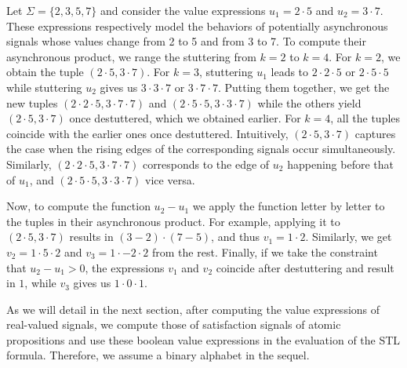 \begin{example} \label{ex:valexpr}
	Let $\Sigma = \{2, 3, 5, 7\}$ and consider the value expressions $u_1 = 2 \cdot 5$ and $u_2 = 3 \cdot 7$.
	These expressions respectively model the behaviors of potentially asynchronous signals whose values change from 2 to 5 and from 3 to 7.
	To compute their asynchronous product, we range the stuttering from $k = 2$ to $k = 4$.
	For $k = 2$, we obtain the tuple $(2 \cdot 5, 3 \cdot 7)$.
	For $k = 3$, stuttering $u_1$ leads to $2 \cdot 2 \cdot 5$ or $2 \cdot 5 \cdot 5$ while stuttering $u_2$ gives us $3 \cdot 3 \cdot 7$ or $3 \cdot 7 \cdot 7$.
	Putting them together, we get the new tuples $(2 \cdot 2 \cdot 5, 3 \cdot 7 \cdot 7)$ and $(2 \cdot 5 \cdot 5, 3 \cdot 3 \cdot 7)$ while the others yield $(2 \cdot 5, 3 \cdot 7)$ once destuttered, which we obtained earlier.
	For $k = 4$, all the tuples coincide with the earlier ones once destuttered.
	Intuitively, $(2 \cdot 5, 3 \cdot 7)$ captures the case when the rising edges of the corresponding signals occur simultaneously.
	Similarly, $(2 \cdot 2 \cdot 5, 3 \cdot 7 \cdot 7)$ corresponds to the edge of $u_2$ happening before that of $u_1$, and $(2 \cdot 5 \cdot 5, 3 \cdot 3 \cdot 7)$ vice versa.
	
	Now, to compute the function $u_2 - u_1$ we apply the function letter by letter to the tuples in their asynchronous product.
	For example, applying it to $(2 \cdot 5, 3 \cdot 7)$ results in $(3 - 2) \cdot (7 - 5)$, and thus $v_1 = 1 \cdot 2$.
	Similarly, we get $v_2 = 1 \cdot 5 \cdot 2$ and $v_3 = 1 \cdot -2 \cdot 2$ from the rest.
	Finally, if we take the constraint that $u_2 - u_1  > 0$, the expressions $v_1$ and $v_2$ coincide after destuttering and result in $1$, while $v_3$ gives us $1 \cdot 0 \cdot 1$.
\end{example}

As we will detail in the next section, after computing the value expressions of real-valued signals, we compute those of satisfaction signals of atomic propositions and use these boolean value expressions in the evaluation of the STL formula.
Therefore, we assume a binary alphabet in the sequel.


